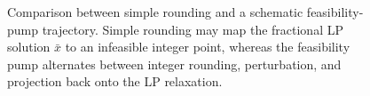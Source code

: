 \begin{figure}[t]
\begin{subfigure}[t]{0.315\textwidth}
\label{fig:fp-zoom}
\end{subfigure}

\caption{Comparison between simple rounding and a schematic feasibility-pump trajectory.
Simple rounding may map the fractional LP solution $\bar{x}$ to an infeasible integer
point, whereas the feasibility pump alternates between integer rounding, perturbation,
and projection back onto the LP relaxation.}
\label{fig:rounding_vs_fp}
\end{figure}